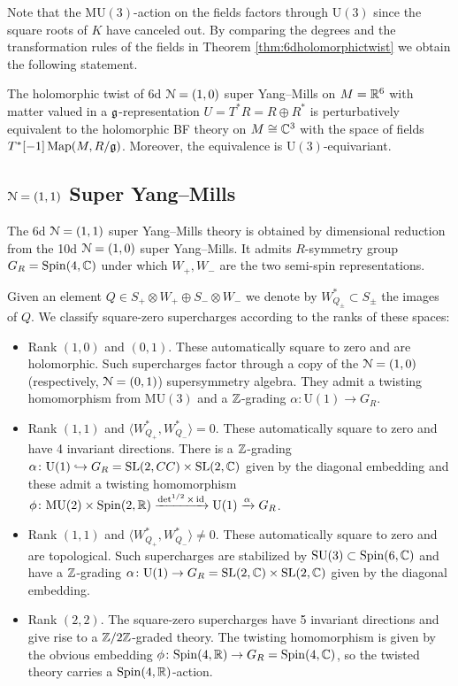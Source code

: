 \documentclass[10pt, oneside]{article}
\newcommand{\MU}{\mathrm{MU}}
\renewcommand{\U}{\mathrm{U}}
\begin{document}
Note that the $\MU(3)$-action on the fields factors through $\U(3)$ since the square roots of $K$ have canceled out. By comparing the degrees and the transformation rules of the fields in Theorem \ref{thm:6dholomorphictwist} we obtain the following statement.

\begin{theorem}
The holomorphic twist of 6d $\mathcal N=(1, 0)$ super Yang--Mills on $M=\mathbb R^6$ with matter valued in a $\mathfrak g$-representation $U=T^*R=R\oplus R^*$ is perturbatively equivalent to the holomorphic BF theory on $M\cong \mathbb C^3$ with the space of fields $T^*[-1]\operatorname{Map}(M, R/\mathfrak g)$. Moreover, the equivalence is $\U(3)$-equivariant.
\label{thm:6dholomorphictwistgraded}
\end{theorem}

\subsection{\texorpdfstring{$\mathcal N=(1, 1)$}{N=(1, 1)} Super Yang--Mills}

The 6d $\mathcal N=(1, 1)$ super Yang--Mills theory is obtained by dimensional reduction from the 10d $\mathcal N=(1, 0)$ super Yang--Mills. It admits $R$-symmetry group $G_R=\mathrm{Spin}(4, \mathbb C)$ under which $W_+, W_-$ are the two semi-spin representations.

Given an element $Q\in S_+\otimes W_+\oplus S_-\otimes W_-$ we denote by $W^*_{Q_\pm}\subset S_\pm$ the images of $Q$. We classify square-zero supercharges according to the ranks of these spaces:
\begin{itemize}
\item Rank $(1, 0)$ and $(0, 1)$. These automatically square to zero and are holomorphic.  Such supercharges factor through a copy of the $\mathcal{N}=(1,0)$ (respectively, $\mathcal N=(0, 1)$) supersymmetry algebra. They admit a twisting homomorphism from $\MU(3)$ and a $\mathbb Z$-grading $\alpha\colon \U(1)\rightarrow G_R$.

\item Rank $(1, 1)$ and $\langle W^*_{Q_+}, W^*_{Q_-}\rangle = 0$. These automatically square to zero and have 4 invariant directions. There is a $\mathbb Z$-grading $\alpha\colon \U(1)\hookrightarrow G_R=\SL(2, CC)\times \SL(2, \CC)$ given by the diagonal embedding and these admit a twisting homomorphism $\phi\colon \MU(2)\times \Spin(2, \RR)\xrightarrow{\det^{1/2}\times \id}\U(1)\xrightarrow{\alpha} G_R$.

\item Rank $(1, 1)$ and $\langle W^*_{Q_+}, W^*_{Q_-}\rangle \neq 0$. These automatically square to zero and are topological. Such supercharges are stabilized by $\mathrm{SU}(3)\subset \mathrm{Spin}(6, \mathbb C)$ and have a $\mathbb Z$-grading $\alpha\colon \U(1)\rightarrow G_R=\SL(2, \CC)\times \SL(2, \CC)$ given by the diagonal embedding.

\item Rank $(2, 2)$. The square-zero supercharges have 5 invariant directions and give rise to a $\mathbb Z/2\mathbb Z$-graded theory. The twisting homomorphism is given by the obvious embedding $\phi\colon \mathrm{Spin}(4, \mathbb R)\rightarrow G_R=\mathrm{Spin}(4, \mathbb C)$, so the twisted theory carries a $\mathrm{Spin}(4, \mathbb R)$-action.
\end{itemize}
\end{document}
